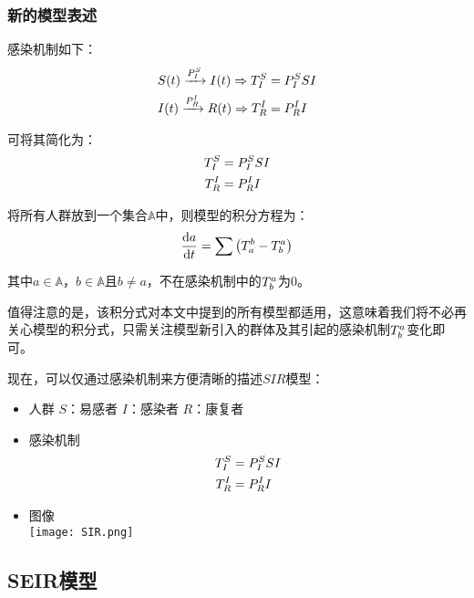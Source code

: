 \subsubsection{新的模型表述}
\par 感染机制如下：
\begin{align}
    S(t)\xrightarrow{P^{S}_{I}}I(t) \Rightarrow T^{S}_{I}&=P^{S}_{I}SI \\
    I(t)\xrightarrow{P^{I}_{R}}R(t) \Rightarrow T^{I}_{R}&=P^{I}_{R}I
\end{align}
\par 可将其简化为：
\begin{align}
    T^{S}_{I}&=P^{S}_{I}SI \\
    T^{I}_{R}&=P^{I}_{R}I
\end{align}
\par 将所有人群放到一个集合$\mathbb{A}$中，则模型的积分方程为：
\begin{equation}
    \frac{\mathrm{d}a}{\mathrm{d}t} = \sum\left(T^{b}_{a}-T^{a}_{b}\right)
\end{equation}
\par 其中$a\in\mathbb{A}$，$b\in\mathbb{A}$且$b\not=a$，不在感染机制中的$T^{a}_{b}$为$0$。
\par 值得注意的是，该积分式对本文中提到的所有模型都适用，这意味着我们将不必再关心模型的积分式，只需关注模型新引入的群体及其引起的感染机制$T^{a}_{b}$变化即可。
\par 现在，可以仅通过感染机制来方便清晰的描述$SIR$模型：
\begin{itemize}
    \item 人群
          \subitem $S$：易感者
          \subitem $I$：感染者
          \subitem $R$：康复者
    \item 感染机制
          \subitem
          \begin{align}
              T^{S}_{I}&=P^{S}_{I}SI \\
              T^{I}_{R}&=P^{I}_{R}I
          \end{align}
    \item 图像
          \\
          \texttt{[image: SIR.png]}
\end{itemize}
\subsection{SEIR模型}
